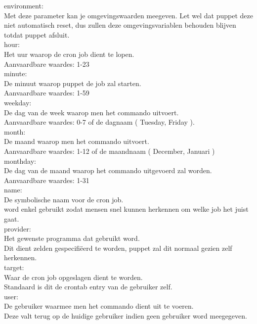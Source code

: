 		environment:\\
		Met deze parameter kan je omgevingswaarden meegeven. Let wel dat puppet deze niet automatisch reset, dus zullen deze omgevingsvariablen behouden blijven totdat puppet afsluit.\\

		hour:\\
		Het uur waarop de cron job dient te lopen.\\
		Aanvaardbare waardes: 1-23\\

		minute:\\
		De minuut waarop puppet de job zal starten.\\
		Aanvaardbare waardes: 1-59\\

		weekday:\\
		De dag van de week waarop men het commando uitvoert.\\
		Aanvaardbare waardes: 0-7 of de dagnaam ( Tuesday, Friday ).\\

		month:\\
		De maand waarop men het commando uitvoert.\\
		Aanvaardbare waardes: 1-12 of de maandnaam ( December, Januari )\\

		monthday:\\
		De dag van de maand waarop het commando uitgevoerd zal worden.\\
		Aanvaardbare waardes: 1-31\\

		name:\\
		De symbolische naam voor de cron job.\\
		word enkel gebruikt zodat mensen snel kunnen herkennen om welke job het juist gaat.\\
		
		provider:\\
		Het gewenste programma dat gebruikt word.\\
		Dit dient zelden gespecifi\"{e}erd te worden, puppet zal dit normaal gezien zelf herkennen.\\

		target:\\
		Waar de cron job opgeslagen dient te worden.\\
		Standaard is dit de crontab entry van de gebruiker zelf.\\

		user:\\
		De gebruiker waarmee men het commando dient uit te voeren.\\
		Deze valt terug op de huidige gebruiker indien geen gebruiker word meegegeven.\\

